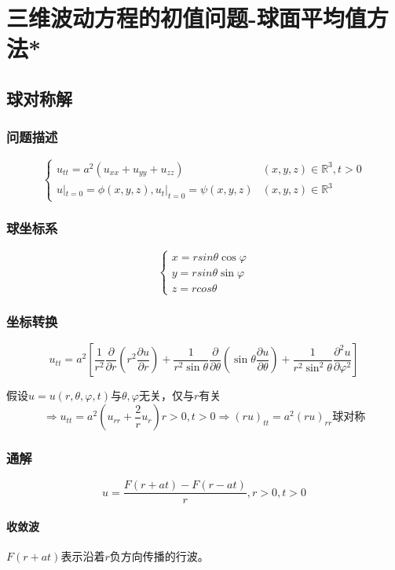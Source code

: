\section{三维波动方程的初值问题-球面平均值方法*}

\subsection{球对称解}

\subsubsection{问题描述}
\[
\begin{cases}u_{tt}=a^2(u_{xx}+u_{yy}+u_{zz})&(x,y,z)\in\mathbb{R}^3,t>0\\u|_{t=0}=\phi(x,y,z),u_t|_{t=0}=\psi(x,y,z)&(x,y,z)\in\mathbb{R}^3\end{cases}
\]

\subsubsection{球坐标系}
\[
\begin{cases}x=rsin\theta\cos{\varphi}\\y=rsin\theta\sin{\varphi}\\z=rcos\theta\end{cases}
\]

\subsubsection{坐标转换}
\[
u_{tt}=a^2\left[\frac{1}{r^2}\frac{\partial}{\partial r}\left(r^2\frac{\partial u}{\partial r}\right)+\frac{1}{r^2\sin{\theta}}\frac{\partial}{\partial\theta}\left(\sin{\theta}\frac{\partial u}{\partial\theta}\right)+\frac{1}{r^2\sin^2{\theta}}\frac{\partial^2u}{\partial\varphi^2}\right] 
\]

假设\(u=u(r,\theta,\varphi,t)\)与\(\theta,\varphi\)无关，仅与\(r\)有关
\[
\Rightarrow u_{tt}=a^2\left(u_{rr}+\frac{2}{r}u_r\right)r>0,t>0	  \Rightarrow\left(ru\right)_{tt}=a^2\left(ru\right)_{rr}\text{球对称}
\]

\subsubsection{通解}
\[
u=\frac{F(r+at)-F(r-at)}{r},r>0,t>0
\]

\paragraph{收敛波}\(F(r+at)\)表示沿着\(r\)负方向传播的行波。


